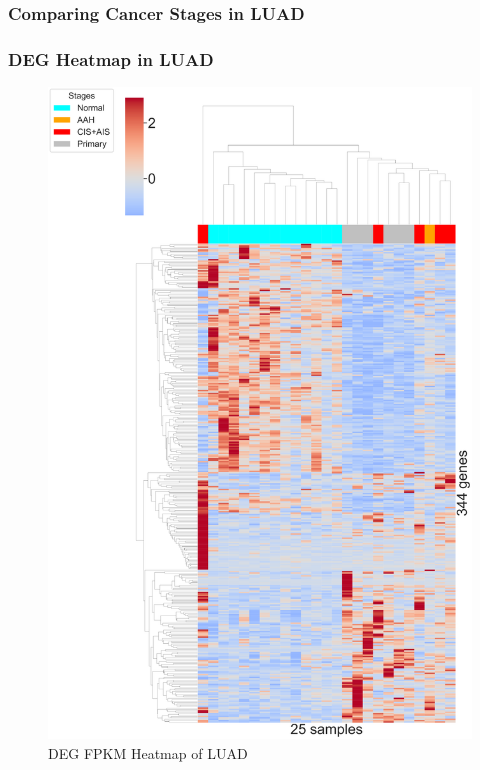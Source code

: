 \documentclass{beamer}
\begin{document}
    \subsubsection{Comparing Cancer Stages in LUAD}
    \begin{frame}
        \frametitle{DEG Heatmap in LUAD}

        \begin{figure}
            \includegraphics[width=0.35 \linewidth]{figures/DEG/Cluster/STAR.FPKM.ADC.pdf}
            \caption{DEG FPKM Heatmap of LUAD}
        \end{figure}
    \end{frame}
\end{document}
